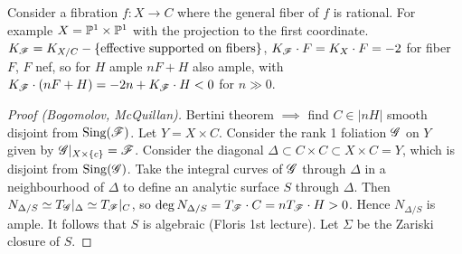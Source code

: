 \begin{remark}
    Consider a fibration $f:X\to C$ where the general fiber of $f$ is rational. For
    example $X=\P^1\times\P^1$ with the projection to the first coordinate.
    $K_\scrF=K_{X/C}-\{\text{effective supported on fibers}\}$,
    $K_\scrF\cdot F=K_X\cdot F=-2$ for fiber $F$, $F$ nef, so for $H$ ample $nF+H$
    also ample, with $K_\scrF\cdot(nF+H)=-2n+K_\scrF\cdot H<0$ for $n\gg0$.
\end{remark}

\begin{proof}[Proof (Bogomolov, McQuillan)]
    Bertini theorem $\implies$ find $C\in|nH|$ smooth disjoint from
    $\Sing(\scrF)$. Let $Y=X\times C$. Consider the rank 1 foliation $\scrG$ on
    $Y$ given by $\scrG|_{X\times\{c\}}=\scrF$. Consider the diagonal
    $\Delta\subset C\times C\subset X\times C=Y$, which is disjoint from
    $\Sing(\scrG)$. Take the integral curves of $\scrG$ through $\Delta$ in a
    neighbourhood of $\Delta$ to define an analytic surface $S$ through
    $\Delta$. Then $N_{\Delta/S}\simeq T_\scrG|_\Delta\simeq T_\scrF|_C$, so
    $\deg N_{\Delta/S}=T_\scrF\cdot C=nT_\scrF\cdot H>0$. Hence $N_{\Delta/S}$
    is ample. It follows that $S$ is algebraic (Floris 1st lecture). Let
    $\Sigma$ be the Zariski closure of $S$. %
\end{proof}
